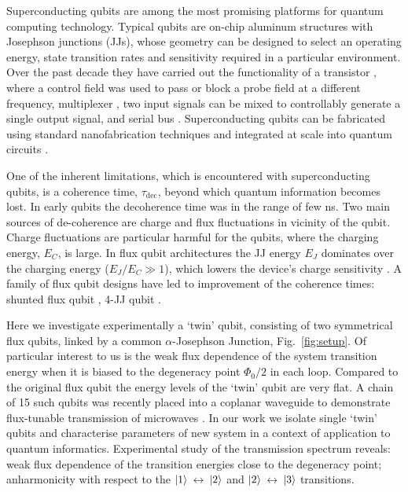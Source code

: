 \documentclass[%
reprint,
superscriptaddress,
bibnotes,
amsmath,
amssymb,
aps,
showkeys,
prb,
]{revtex4-1}
\newcommand{\iket}[1]{\ensuremath{\Ket{#1}}}
\newcommand{\ilra}{\ensuremath{\,\leftrightarrow\,}}
\begin{document}
Superconducting  qubits  are  among  the most  promising  platforms  for  quantum  computing
technology. Typical  qubits are  on-chip aluminum structures  with Josephson  junctions (JJs),
whose geometry  can be  designed to  select an  operating energy,  state transition  rates and
sensitivity required in a particular environment.  Over  the past decade they have carried out
the   functionality   of   a   transistor   \cite{Astafiev_2010,   Hoi_2011,   Abdumalikov_2010,
  Astafiev_2010_2},  where a  control field  was used  to pass or block a  probe field  at a
different  frequency,  multiplexer  \cite{H_nigl_Decrinis_2018},  two  input signals  can  be  mixed  to
controllably generate a single output signal, and serial bus \cite{Shen_2005}.  Superconducting
qubits can  be fabricated using  standard nanofabrication  techniques and integrated  at scale
into quantum circuits \cite{Johnson_2010}.

One  of the  inherent limitations,  which  is encountered with superconducting qubits, is  a coherence  time,
$\tau_{\text{dec}}$, beyond  which quantum information  becomes lost. In early qubits the decoherence time was in the range of few ns. Two main sources of de-coherence are charge and flux fluctuations in vicinity of the qubit. Charge fluctuations are particular harmful for the qubits, where the charging energy, $E_C$, is large. In  flux qubit
architectures the JJ  energy $E_J$ dominates over  the charging energy  ($E_J/E_C \gg 1$),
which lowers  the device's  charge sensitivity  \cite{Orlando_1999,Chiorescu_2003,Mooij_1999}. A
family  of flux qubit designs  have led to  improvement of the coherence  times: shunted
flux qubit \cite{Yan_2016} , 4-JJ qubit \cite{Qiu_2016,Pop_2014}.


Here we investigate experimentally a `twin'  qubit, consisting of two symmetrical flux qubits,
linked by a common $ \alpha$-Josephson Junction, Fig.~\ref{fig:setup}.  Of particular interest to us is the weak flux dependence of the
system transition  energy when  it is  biased to the  degeneracy point  $\Phi_0/2 $ in each loop. Compared to the original flux qubit the energy levels of the `twin' qubit are very flat. A chain of 15 such qubits
was recently  placed into  a coplanar  waveguide to  demonstrate flux-tunable  transmission of
microwaves \cite{Shulga_2018}. In our work we  isolate single `twin' qubits and characterise parameters of new system in a context of application to quantum informatics. Experimental study of the transmission spectrum reveals: weak flux
dependence  of the  transition  energies close  to  the degeneracy  point;
anharmonicity with respect  to the  \iket{1}\ilra\iket{2} and  \iket{2}\ilra\iket{3} transitions.
\end{document}
